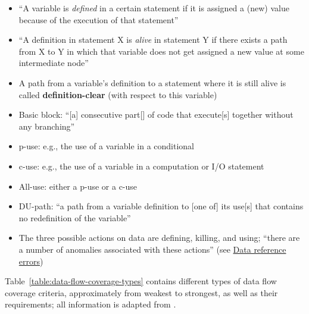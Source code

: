 \begin{itemize}
    \item ``A variable is \emph{defined} in a certain statement if it is
          assigned a (new) value because of the execution of that
          statement'' \citep[p.~424]{vanVliet2000}
    \item ``A definition in statement X is \emph{alive} in statement Y if
          there exists a path from X to Y in which that variable does not
          get assigned a new value at some intermediate node''
          \citep[p.~424]{vanVliet2000}
    \item A path from a variable's definition to a statement where it is
          still alive is called \textbf{definition-clear} (with respect to
          this variable) \citep[p.~424]{vanVliet2000}
    \item Basic block: ``[a] consecutive part[] of code that execute[s]
          together without any branching'' \citep[p.~477]{PetersAndPedrycz2000}
    \item \acf{p-use}: e.g., the use of a variable in a conditional
          \citep[p.~424]{vanVliet2000}
    \item \acf{c-use}: e.g., the use of a variable in a computation or I/O
          statement \citep[p.~424]{vanVliet2000}
    \item All-use: either a \acs{p-use} or a \acs{c-use}~
          \citep[p.~478]{PetersAndPedrycz2000}
    \item DU-path: ``a path from a variable definition to [one of] its use[s]
          that contains no redefinition of the variable''
          \citep[pp.~478-479]{PetersAndPedrycz2000}
    \item The three possible actions on data are defining, killing, and using;
          ``there are a number of anomalies associated with these actions''
          \citep[pp.~478,~480]{PetersAndPedrycz2000}
          (see \hyperref[data-ref-errors]{Data reference errors})
\end{itemize}

Table~\ref{table:data-flow-coverage-types} contains different types of data
flow coverage criteria, approximately from weakest to strongest, as well as
their requirements; all information is adapted from
\citep[pp.~424-425]{vanVliet2000} .


